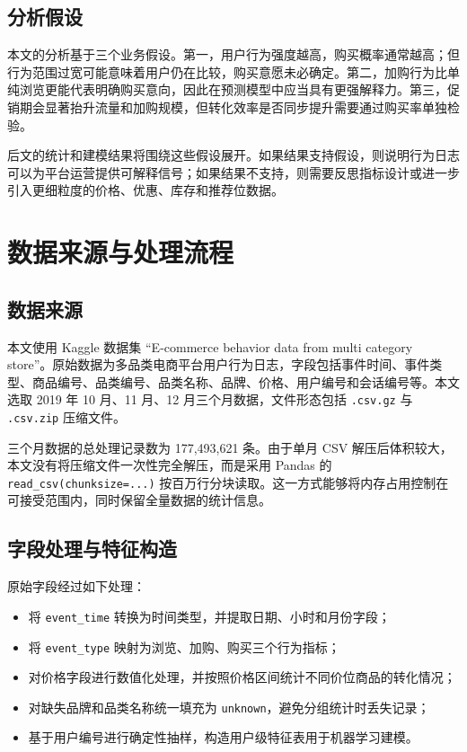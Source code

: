 \documentclass[12pt,hyperref,a4paper,UTF8]{ctexart}
\begin{document}
\subsection{分析假设}

本文的分析基于三个业务假设。第一，用户行为强度越高，购买概率通常越高；但行为范围过宽可能意味着用户仍在比较，购买意愿未必确定。第二，加购行为比单纯浏览更能代表明确购买意向，因此在预测模型中应当具有更强解释力。第三，促销期会显著抬升流量和加购规模，但转化效率是否同步提升需要通过购买率单独检验。

后文的统计和建模结果将围绕这些假设展开。如果结果支持假设，则说明行为日志可以为平台运营提供可解释信号；如果结果不支持，则需要反思指标设计或进一步引入更细粒度的价格、优惠、库存和推荐位数据。

\section{数据来源与处理流程}

\subsection{数据来源}

本文使用 Kaggle 数据集 ``E-commerce behavior data from multi category store''。原始数据为多品类电商平台用户行为日志，字段包括事件时间、事件类型、商品编号、品类编号、品类名称、品牌、价格、用户编号和会话编号等。本文选取 2019 年 10 月、11 月、12 月三个月数据，文件形态包括 \texttt{.csv.gz} 与 \texttt{.csv.zip} 压缩文件。

三个月数据的总处理记录数为 177,493,621 条。由于单月 CSV 解压后体积较大，本文没有将压缩文件一次性完全解压，而是采用 Pandas 的 \texttt{read\_csv(chunksize=...)} 按百万行分块读取。这一方式能够将内存占用控制在可接受范围内，同时保留全量数据的统计信息。

\subsection{字段处理与特征构造}

原始字段经过如下处理：
\begin{itemize}
  \item 将 \texttt{event\_time} 转换为时间类型，并提取日期、小时和月份字段；
  \item 将 \texttt{event\_type} 映射为浏览、加购、购买三个行为指标；
  \item 对价格字段进行数值化处理，并按照价格区间统计不同价位商品的转化情况；
  \item 对缺失品牌和品类名称统一填充为 \texttt{unknown}，避免分组统计时丢失记录；
  \item 基于用户编号进行确定性抽样，构造用户级特征表用于机器学习建模。
\end{itemize}
\end{document}
